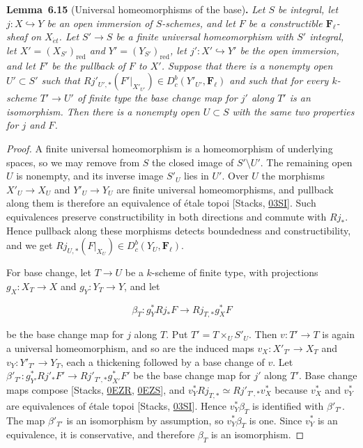 \documentclass[11pt]{article}
\newenvironment{bpstatement}[2]{\par\addvspace{0.6\baselineskip}\noindent\textbf{#1}#2\textbf{.}\enspace\ignorespaces}
  {\par\addvspace{0.4\baselineskip}}
\newenvironment{bpstatementit}[2]{\begin{bpstatement}{#1}{#2}\itshape\ignorespaces}{\end{bpstatement}}
\providecommand{\Dbc}{}\renewcommand{\Dbc}{D^b_c}
\providecommand{\Fell}{}\renewcommand{\Fell}{\mathbf F_\ell}
\begin{document}
\label{bp559}%
\begin{bpstatementit}{Lemma~6.15}{ (Universal homeomorphisms of the base)}
Let \(S\) be integral, let \(j:X\hookrightarrow Y\) be an open immersion of \(S\)-schemes, and let \(F\) be a constructible \(\Fell\)-sheaf on \(X_{\acute{e}t}\). Let \(S'\to S\) be a finite universal homeomorphism with \(S'\) integral, let \(X'=(X_{S'})_{\mathrm{red}}\) and \(Y'=(Y_{S'})_{\mathrm{red}}\), let \(j':X'\hookrightarrow Y'\) be the open immersion, and let \(F'\) be the pullback of \(F\) to \(X'\). Suppose that there is a nonempty open \(U'\subset S'\) such that \(Rj'_{U',*}(F'|_{X'_{U'}})\in\Dbc(Y'_{U'},\Fell)\) and such that for every \(k\)-scheme \(T'\to U'\) of finite type the base change map for \(j'\) along \(T'\) is an isomorphism. Then there is a nonempty open \(U\subset S\) with the same two properties for \(j\) and \(F\).
\end{bpstatementit}

\begin{proof}[{Proof}]\label{bp560}%
A finite universal homeomorphism is a homeomorphism of underlying spaces, so we may remove from \(S\) the closed image of \(S'\setminus U'\). The remaining open \(U\) is nonempty, and its inverse image \(S'_U\) lies in \(U'\). Over \(U\) the morphisms \(X'_U\to X_U\) and \(Y'_U\to Y_U\) are finite universal homeomorphisms, and pullback along them is therefore an equivalence of étale topoi [Stacks, \href{https://stacks.math.columbia.edu/tag/03SI}{03SI}]. Such equivalences preserve constructibility in both directions and commute with \(Rj_*\). Hence pullback along these morphisms detects boundedness and constructibility, and we get \(Rj_{U,*}(F|_{X_U})\in\Dbc(Y_U,\Fell)\).

For base change, let \(T\to U\) be a \(k\)-scheme of finite type, with projections \(g_X:X_T\to X\) and \(g_Y:Y_T\to Y\), and let

\[
\beta_T:g_Y^*Rj_*F\longrightarrow Rj_{T,*}g_X^*F
\]

be the base change map for \(j\) along \(T\). Put \(T'=T\times_US'_U\). Then \(v:T'\to T\) is again a universal homeomorphism, and so are the induced maps \(v_X:X'_{T'}\to X_T\) and \(v_Y:Y'_{T'}\to Y_T\), each a thickening followed by a base change of \(v\). Let \(\beta'_{T'}:g_{Y'}^*Rj'_*F'\to Rj'_{T',*}g_{X'}^*F'\) be the base change map for \(j'\) along \(T'\). Base change maps compose [Stacks, \href{https://stacks.math.columbia.edu/tag/0EZR}{0EZR}, \href{https://stacks.math.columbia.edu/tag/0EZS}{0EZS}], and \(v_Y^*Rj_{T,*}\simeq Rj'_{T',*}v_X^*\) because \(v_X^*\) and \(v_Y^*\) are equivalences of étale topoi [Stacks, \href{https://stacks.math.columbia.edu/tag/03SI}{03SI}]. Hence \(v_Y^*\beta_T\) is identified with \(\beta'_{T'}\). The map \(\beta'_{T'}\) is an isomorphism by assumption, so \(v_Y^*\beta_T\) is one. Since \(v_Y^*\) is an equivalence, it is conservative, and therefore \(\beta_T\) is an isomorphism.
\end{proof}
\end{document}
